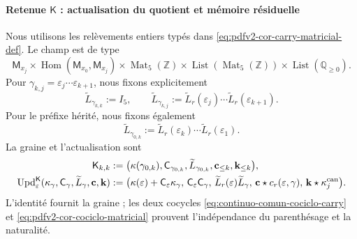 \paragraph{Retenue \(\mathsf K\) : actualisation du quotient et mémoire résiduelle}
Nous utilisons les relèvements entiers typés dans \eqref{eq:pdfv2-cor-carry-matricial-def}. Le champ est de type
\[
 \mathsf M_{x_j}\times
 \operatorname{Hom}(\mathsf M_{x_0},\mathsf M_{x_j})
 \times\operatorname{Mat}_5(\mathbb Z)
 \times\operatorname{List}(\operatorname{Mat}_5(\mathbb Z))
 \times\operatorname{List}(\mathbb Q_{\geq0}).
\]
Pour \(\gamma_{k,j}=\varepsilon_j\cdots\varepsilon_{k+1}\), nous fixons explicitement
\begin{equation}
\label{eq:pdfv2-terminal-lift-entero-ruta}
 \widetilde L_{\gamma_{k,k}}:=I_5,\qquad
 \widetilde L_{\gamma_{k,j}}
 :=\widetilde L_r(\varepsilon_j)\cdots
   \widetilde L_r(\varepsilon_{k+1}).
\end{equation}
Pour le préfixe hérité, nous fixons également
\[
 \widetilde L_{\gamma_{0,k}}
 :=\widetilde L_r(\varepsilon_k)\cdots
   \widetilde L_r(\varepsilon_1).
\]
La graine et l'actualisation sont
\begin{align}
 \mathsf K_{k,k}&:=
 \bigl(\kappa(\gamma_{0,k}),\mathsf C_{\gamma_{0,k}},
       \widetilde L_{\gamma_{0,k}},
       \mathbf c_{\leq k},\mathbf k_{\leq k}\bigr),
 \label{eq:pdfv2-terminal-semilla-k}\\
 \operatorname{Upd}^{\mathsf K}_{\varepsilon}
 (\kappa_\gamma,\mathsf C_\gamma,\widetilde L_\gamma,
   \mathbf c,\mathbf k)
 &:=
 \bigl(\kappa(\varepsilon)+\mathsf C_\varepsilon\kappa_\gamma,\,
 \mathsf C_\varepsilon\mathsf C_\gamma,\,
 \widetilde L_r(\varepsilon)\widetilde L_\gamma,\,
 \mathbf c\star c_r(\varepsilon,\gamma),\,
 \mathbf k\star\kappa_j^{\rm can}\bigr).
 \label{eq:pdfv2-terminal-update-k}
\end{align}
L'identité fournit la graine ; les deux cocycles \eqref{eq:continuo-comun-cociclo-carry} et \eqref{eq:pdfv2-cor-cociclo-matricial} prouvent l'indépendance du parenthésage et la naturalité.

